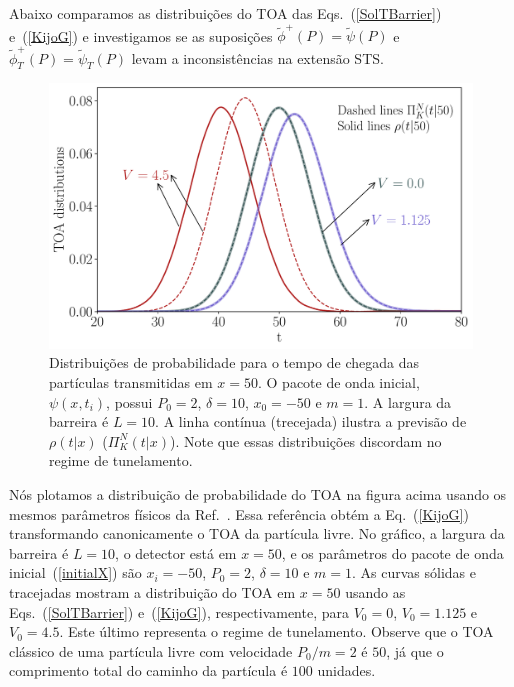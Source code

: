 Abaixo comparamos as distribuições do TOA das Eqs.~(\ref{SolTBarrier}) e~(\ref{KijoG}) e investigamos se as suposições ${\tilde \phi}^+(P)={\tilde \psi} (P)$ e ${\tilde \phi}^+_T(P)={\tilde \psi}_{T}(P)$ levam a inconsistências na extensão STS.
\begin{figure}[H]
    \centering
    \includegraphics[width=14cm]{anexos/paper.pdf}
    \caption{Distribuições de probabilidade para o tempo de chegada das partículas transmitidas em $x=50$. O pacote de onda inicial, $\psi(x,t_i)$, possui $P_0=2$, $\delta=10$, $x_0=-50$ e $m=1$. A largura da barreira é $L = 10$. A linha contínua (trecejada) ilustra a previsão de $\rho(t|x)$ ($\Pi_K^N(t|x)$). Note que essas distribuições discordam no regime de tunelamento.}
    \label{fig:paper}
\end{figure}


Nós plotamos a distribuição de probabilidade do TOA na figura acima usando os mesmos parâmetros físicos da Ref.~\cite{Leon}. Essa referência obtém a Eq.~(\ref{KijoG}) transformando canonicamente o TOA da partícula livre. No gráfico, a largura da barreira é $L=10$, o detector está em $x=50$, e os parâmetros do pacote de onda inicial~(\ref{initialX}) são $x_i=-50$, $P_0=2$, $\delta= 10$ e $m=1$. As curvas sólidas e tracejadas mostram a distribuição do TOA em $x=50$ usando as Eqs.~(\ref{SolTBarrier}) e~(\ref{KijoG}), respectivamente, para $V_0=0 $, $V_0=1.125$ e $V_0=4.5$. Este último representa o regime de tunelamento. Observe que o TOA clássico de uma partícula livre com velocidade $P_0/m=2$ é $50$, já que o comprimento total do caminho da partícula é $100 $ unidades.



